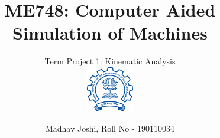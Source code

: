 \sectionfont{\large\sf\bfseries\color{black!60!blue}} 
\subsectionfont{\normalsize\sf\bfseries}

\title{ME748: Computer Aided Simulation of Machines}

\subtitle{Term Project 1: Kinematic Analysis \\
\hfill\includegraphics[height=2cm]{Images/Indian_Institute_of_Technology_Bombay_Logo.png}
\vspace{-2cm}}

\author{Madhav Joshi, Roll No - 190110034} 
